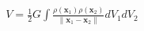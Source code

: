 \documentclass[preview]{standalone}
\begin{document}
\begin{align*}
V=\frac{1}{2}G\int\frac{\rho(\mathbf x_1)\rho(\mathbf x_2)}{\|\mathbf x_1-\mathbf x_2\|}dV_1dV_2
\end{align*}
\end{document}
